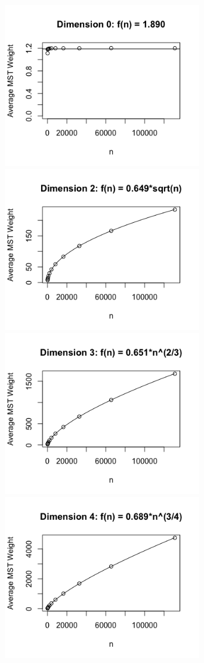 \documentclass[a4paper]{article}
\begin{document}
\includegraphics[width=3.4in]{dim0plot}
\includegraphics[width=3.4in]{dim2plot}\\
\includegraphics[width=3.4in]{dim3plot}
\includegraphics[width=3.4in]{dim4plot}
\end{document}
